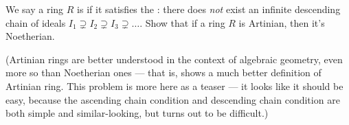 \begin{problem}
	\twochili
	We say a ring $R$ is 
	if it satisfies the :
	there does \emph{not} exist an infinite descending chain of ideals
	$I_1 \supsetneq I_2 \supsetneq I_3 \supsetneq \dots$.
	Show that if a ring $R$ is Artinian, then it's Noetherian.

	(Artinian rings are better understood in the context of algebraic geometry,
	even more so than Noetherian ones ---
	that is,  shows a much better definition of Artinian ring.
	This problem is more here as a teaser --- it looks like it should be easy,
	because the ascending chain condition and descending chain condition are
	both simple and similar-looking, but turns out to be difficult.)
	\label{prob:akizuki}
\end{problem}
